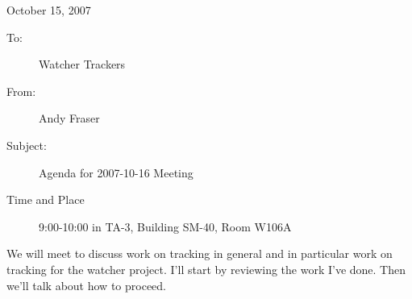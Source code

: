 \documentclass{article}
\begin{document}
\noindent
\hfill October 15, 2007\\
\noindent
\begin{description}
\item[To:] Watcher Trackers
\item[From:] Andy Fraser
\item[Subject:] Agenda for 2007-10-16 Meeting
\item[Time and Place] 9:00-10:00 in TA-3, Building SM-40, Room W106A
\vspace{1cm}
\end{description}

\noindent
We will meet to discuss work on tracking in general and in particular
work on tracking for the watcher project.  I'll start by reviewing the
work I've done.  Then we'll talk about how to proceed.
\end{document}
